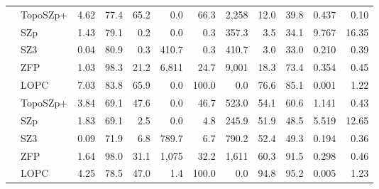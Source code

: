 \begin{tabular}{@{}llrrrrrrrrrr@{}}
\addlinespace[2pt]
\multirow{5}{*}{NYX} & TopoSZp+ & 4.62 & 77.4 & 65.2 & 0.0 & 66.3 & 2{,}258 & 12.0 & 39.8 & 0.437 & 0.10 \\
 & SZp & 1.43 & 79.1 & 0.2 & 0.0 & 0.3 & 357.3 & 3.5 & 34.1 & 9.767 & 16.35 \\
 & SZ3 & 0.04 & 80.9 & 0.3 & 410.7 & 0.3 & 410.7 & 3.0 & 33.0 & 0.210 & 0.39 \\
 & ZFP & 1.03 & 98.3 & 21.2 & 6{,}811 & 24.7 & 9{,}001 & 18.3 & 73.4 & 0.354 & 0.45 \\
 & LOPC & 7.03 & 83.8 & 65.9 & 0.0 & 100.0 & 0.0 & 76.6 & 85.1 & 0.001 & 1.22 \\
\addlinespace[2pt]
\multirow{5}{*}{SCALE} & TopoSZp+ & 3.84 & 69.1 & 47.6 & 0.0 & 46.7 & 523.0 & 54.1 & 60.6 & 1.141 & 0.43 \\
 & SZp & 1.83 & 69.1 & 2.5 & 0.0 & 4.8 & 245.9 & 51.9 & 48.5 & 5.519 & 12.65 \\
 & SZ3 & 0.09 & 71.9 & 6.8 & 789.7 & 6.7 & 790.2 & 52.4 & 49.3 & 0.194 & 0.36 \\
 & ZFP & 1.64 & 98.0 & 31.1 & 1{,}075 & 32.2 & 1{,}611 & 60.3 & 91.5 & 0.298 & 0.46 \\
 & LOPC & 4.25 & 78.5 & 47.0 & 1.4 & 100.0 & 0.0 & 94.8 & 95.2 & 0.005 & 1.23 \\
\bottomrule
\end{tabular}
